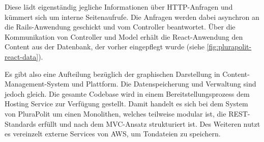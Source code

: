
Diese lädt eigenständig jegliche Informationen über HTTP-Anfragen und kümmert sich um interne Seitenaufrufe. Die Anfragen werden dabei asynchron an die Rails-Anwendung geschickt und vom Controller beantwortet. Über die Kommunikation von Controller und Model erhält die React-Anwendung den Content aus der Datenbank, der vorher eingepflegt wurde (siehe \cref{fig:plurapolit-react-data}).

Es gibt also eine Aufteilung bezüglich der graphischen Darstellung in Content-Management-System und Plattform. Die Datenspeicherung und Verwaltung sind jedoch gleich. Die gesamte Codebase wird in einem Bereitstellungsprozess dem Hosting Service zur Verfügung gestellt. Damit handelt es sich bei dem System von PluraPolit um einen Monolithen, welches teilweise modular ist, die REST-Standards erfüllt und nach dem MVC-Ansatz strukturiert ist. Des Weiteren nutzt es vereinzelt externe Services von AWS, um Tondateien zu speichern.
